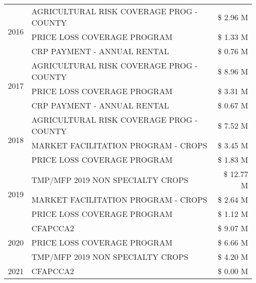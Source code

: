 \begin{tabular}{llr}
\cline{1-3}
\multirow[t]{3}{*}{2016} & AGRICULTURAL RISK COVERAGE PROG - COUNTY & \$ 2.96 M \\
 & PRICE LOSS COVERAGE PROGRAM & \$ 1.33 M \\
 & CRP PAYMENT - ANNUAL RENTAL & \$ 0.76 M \\
\cline{1-3}
\multirow[t]{3}{*}{2017} & AGRICULTURAL RISK COVERAGE PROG - COUNTY & \$ 8.96 M \\
 & PRICE LOSS COVERAGE PROGRAM & \$ 3.31 M \\
 & CRP PAYMENT - ANNUAL RENTAL & \$ 0.67 M \\
\cline{1-3}
\multirow[t]{3}{*}{2018} & AGRICULTURAL RISK COVERAGE PROG - COUNTY & \$ 7.52 M \\
 & MARKET FACILITATION PROGRAM - CROPS & \$ 3.45 M \\
 & PRICE LOSS COVERAGE PROGRAM & \$ 1.83 M \\
\cline{1-3}
\multirow[t]{3}{*}{2019} & TMP/MFP 2019 NON SPECIALTY CROPS & \$ 12.77 M \\
 & MARKET FACILITATION PROGRAM - CROPS & \$ 2.64 M \\
 & PRICE LOSS COVERAGE PROGRAM & \$ 1.12 M \\
\cline{1-3}
\multirow[t]{3}{*}{2020} & CFAPCCA2 & \$ 9.07 M \\
 & PRICE LOSS COVERAGE PROGRAM & \$ 6.66 M \\
 & TMP/MFP 2019 NON SPECIALTY CROPS & \$ 4.20 M \\
\cline{1-3}
2021 & CFAPCCA2 & \$ 0.00 M \\
\cline{1-3}
\bottomrule
\end{tabular}
